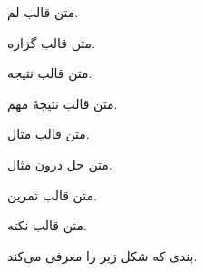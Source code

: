\begin{ELlemma}{}

متن قالب لم.

\end{ELlemma}

\begin{ELproposition}{}

متن قالب گزاره.

\end{ELproposition}

\begin{ELcorollary}{}

متن قالب نتیجه.

\end{ELcorollary}

\begin{ELimportant}{}

متن قالب نتیجهٔ مهم.

\end{ELimportant}

\begin{ELexample}{}

متن قالب مثال.

\begin{ELsolution}

متن حل درون مثال.

\end{ELsolution}

\end{ELexample}

\begin{ELexercise}{}

متن قالب تمرین.

\end{ELexercise}

\begin{ELremark}{}

متن قالب نکته.

\end{ELremark}

\ELhold


\begin{ELunit}

بندی که شکل زیر را معرفی می‌کند.


\end{ELunit}

